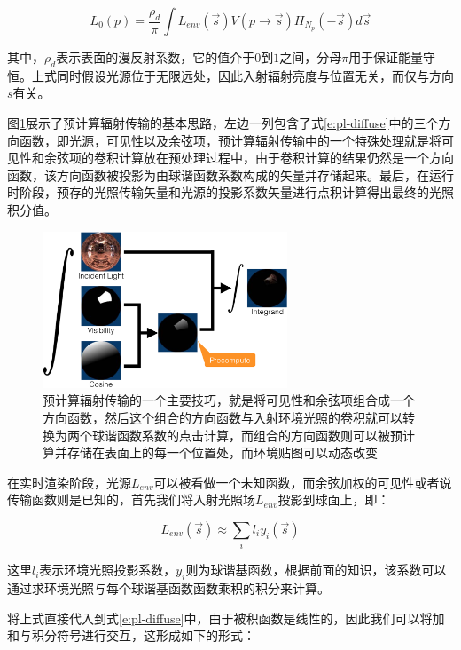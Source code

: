 \begin{equation}\label{e:pl-diffuse}
	L_0(p)=\frac{\rho_d}{\pi}\int L_{env}(\vec{s})V(p\to\vec{s})H_{N_p}(-\vec{s})d\vec{s}
\end{equation} 

\noindent 其中，$\rho_d$表示表面的漫反射系数，它的值介于$0$到$1$之间，分母$\pi$用于保证能量守恒。上式同时假设光源位于无限远处，因此入射辐射亮度与位置无关，而仅与方向$s$有关。

图\ref{f:pl-diffuse}展示了预计算辐射传输的基本思路，左边一列包含了式\ref{e:pl-diffuse}中的三个方向函数，即光源，可见性以及余弦项，预计算辐射传输中的一个特殊处理就是将可见性和余弦项的卷积计算放在预处理过程中，由于卷积计算的结果仍然是一个方向函数，该方向函数被投影为由球谐函数系数构成的矢量并存储起来。最后，在运行时阶段，预存的光照传输矢量和光源的投影系数矢量进行点积计算得出最终的光照积分值。

\begin{figure}
	\sidecaption
	\includegraphics[width=0.65\textwidth]{figures/prt/prt-7}
	\caption{预计算辐射传输的一个主要技巧，就是将可见性和余弦项组合成一个方向函数，然后这个组合的方向函数与入射环境光照的卷积就可以转换为两个球谐函数系数的点击计算，而组合的方向函数则可以被预计算并存储在表面上的每一个位置处，而环境贴图可以动态改变}
	\label{f:pl-diffuse}
\end{figure}

在实时渲染阶段，光源$L_{env}$可以被看做一个未知函数，而余弦加权的可见性或者说传输函数则是已知的，首先我们将入射光照场$L_{env}$投影到球面上，即：

\begin{equation}
	L_{env}(\vec{s})\approx\sum_{i}l_iy_i(\vec{s})
\end{equation}

\noindent 这里$l_i$表示环境光照投影系数，$y_i$则为球谐基函数，根据前面的知识，该系数可以通过求环境光照与每个球谐基函数函数乘积的积分来计算。

将上式直接代入到式\ref{e:pl-diffuse}中，由于被积函数是线性的，因此我们可以将加和与积分符号进行交互，这形成如下的形式：

